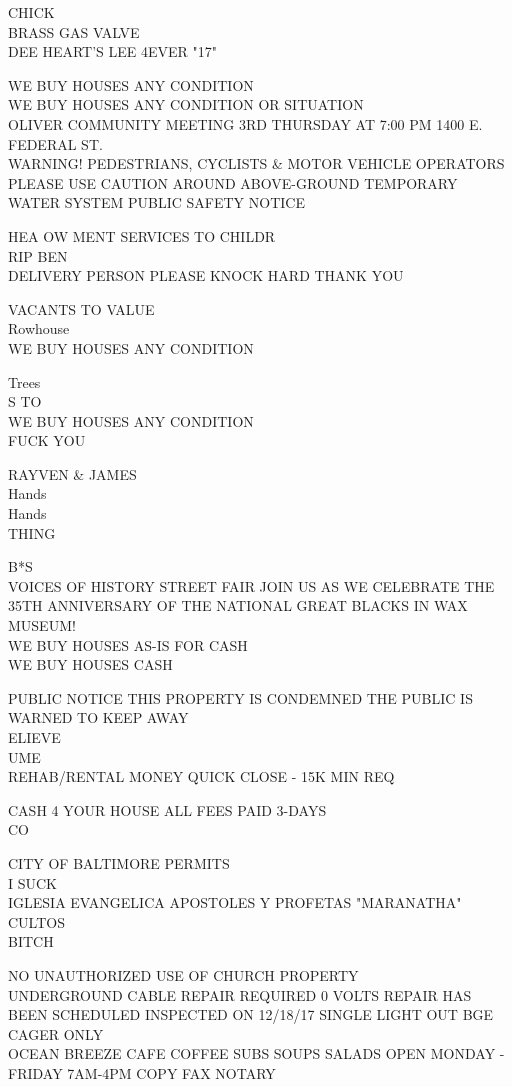 \documentclass[10pt,letterpaper]{article}
\begin{document}
CHICK\\
BRASS GAS VALVE\\
DEE HEART'S LEE 4EVER "17"

WE BUY HOUSES ANY CONDITION\\
WE BUY HOUSES ANY CONDITION OR SITUATION\\
OLIVER COMMUNITY MEETING 3RD THURSDAY AT 7:00 PM 1400 E. FEDERAL ST.\\
WARNING!  PEDESTRIANS, CYCLISTS \& MOTOR VEHICLE OPERATORS PLEASE USE CAUTION AROUND ABOVE{-}GROUND TEMPORARY WATER SYSTEM PUBLIC SAFETY NOTICE

HEA OW MENT SERVICES TO CHILDR\\
RIP BEN\\
DELIVERY PERSON PLEASE KNOCK HARD THANK YOU

VACANTS TO VALUE\\
Rowhouse\\
WE BUY HOUSES ANY CONDITION

Trees\\
S TO\\
WE BUY HOUSES ANY CONDITION\\
FUCK YOU

RAYVEN \& JAMES\\
Hands\\
Hands\\
THING

B*S\\
VOICES OF HISTORY STREET FAIR JOIN US AS WE CELEBRATE THE 35TH ANNIVERSARY OF THE NATIONAL GREAT BLACKS IN WAX MUSEUM!\\
WE BUY HOUSES AS{-}IS FOR CASH\\
WE BUY HOUSES CASH

PUBLIC NOTICE THIS PROPERTY IS CONDEMNED THE PUBLIC IS WARNED TO KEEP AWAY\\
ELIEVE\\
UME\\
REHAB/RENTAL MONEY QUICK CLOSE {-} 15K MIN REQ

CASH 4 YOUR HOUSE ALL FEES PAID 3{-}DAYS\\
CO

CITY OF BALTIMORE PERMITS\\
I SUCK\\
IGLESIA EVANGELICA APOSTOLES Y PROFETAS "MARANATHA" CULTOS\\
BITCH

NO UNAUTHORIZED USE OF CHURCH PROPERTY\\
UNDERGROUND CABLE REPAIR REQUIRED 0 VOLTS REPAIR HAS BEEN SCHEDULED INSPECTED ON 12/18/17 SINGLE LIGHT OUT BGE\\
CAGER ONLY\\
OCEAN BREEZE CAFE COFFEE SUBS SOUPS SALADS OPEN MONDAY {-} FRIDAY 7AM{-}4PM COPY FAX NOTARY
\end{document}
